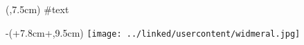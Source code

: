 \begin{textblock*}{7.6cm}(\rborder,7.5cm)
#text
\end{textblock*}
\begin{textblock*}{\textwidth-4.5cm-\columnsep}(\rborder+7.8cm+\columnsep,9.5cm)
\noindent
\texttt{[image: ../linked/usercontent/widmeral.jpg]}
\end{textblock*}
\vspace*{15cm}
